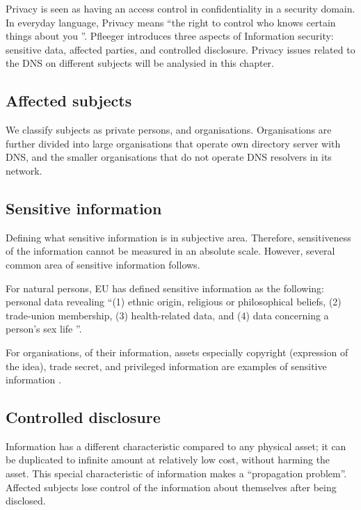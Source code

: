 Privacy is seen as having an access control in confidentiality in a security domain.
In everyday language, Privacy means ``the right to control who knows certain things about you \cite{securityincomputing}''.
Pfleeger introduces three aspects of Information security: sensitive data, affected parties, and controlled disclosure.
Privacy issues related to the DNS on different subjects will be analysied in this chapter.

\subsection{Affected subjects}
We classify subjects as private persons, and organisations. Organisations are further divided into large organisations that operate own directory server with DNS, and the smaller organisations that do not operate DNS resolvers in its network.

\subsection{Sensitive information}
Defining what sensitive information is in subjective area.
Therefore, sensitiveness of the information cannot be measured in an absolute scale. However, several common area of sensitive information follows.

For natural persons, EU has defined sensitive information as the following: personal data revealing ``(1) ethnic origin, religious or philosophical beliefs, (2) trade-union membership, (3) health-related data, and (4) data concerning a person's sex life \cite{GDPR}''.

For organisations, of their information, assets especially copyright (expression of the idea), trade secret, and privileged information are examples of sensitive information \cite{securityincomputing}.

\subsection{Controlled disclosure}
Information has a different characteristic compared to any physical asset; it can be duplicated to infinite amount at relatively low cost, without harming the asset.
This special characteristic of information makes a ``propagation problem''.
Affected subjects lose control of the information about themselves after being disclosed.

